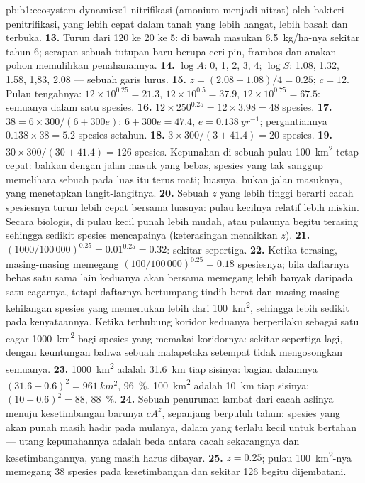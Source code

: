 \begin{solution}{pb:b1:ecosystem-dynamics:1}
nitrifikasi (amonium menjadi nitrat) oleh bakteri penitrifikasi, yang
lebih cepat dalam tanah yang lebih hangat, lebih basah dan terbuka.
\textbf{13.} Turun dari \num{120} ke \num{20} ke \num{5}: di bawah
masukan \qty{6.5}{kg/ha}-nya sekitar tahun 6; serapan sebuah tutupan
baru berupa ceri pin, frambos dan anakan pohon memulihkan
penahanannya.
\textbf{14.} $\log A$: 0, 1, 2, 3, 4; $\log S$: 1.08, 1.32, 1.58,
1,83, 2,08 --- sebuah garis lurus.
\textbf{15.} $z = (2.08 - 1.08)/4 = 0.25$; $c = 12$. Pulau tengahnya:
$12\times 10^{0.25} = 21.3$, $12\times 10^{0.5} = 37.9$, $12\times
10^{0.75} = 67.5$: semuanya dalam satu spesies.
\textbf{16.} $12\times 250^{0.25} = 12\times 3.98 = 48$ spesies.
\textbf{17.} $38 = 6\times 300/(6 + 300e)$: $6 + 300e = 47.4$, $e =
\qty{0.138}{yr^{-1}}$; pergantiannya $0.138\times 38 = 5.2$ spesies setahun.
\textbf{18.} $3\times 300/(3 + 41.4) = 20$ spesies.
\textbf{19.} $30\times 300/(30 + 41.4) = 126$ spesies. Kepunahan di
sebuah pulau \qty{100}{km^2} tetap cepat: bahkan dengan jalan masuk
yang bebas, spesies yang tak sanggup memelihara sebuah  pada
luas itu terus mati; luasnya, bukan jalan masuknya, yang menetapkan
langit-langitnya.
\textbf{20.} Sebuah $z$ yang lebih tinggi berarti cacah spesiesnya
turun lebih cepat bersama luasnya: pulau kecilnya relatif lebih
miskin. Secara biologis,  di pulau kecil punah lebih mudah,
atau pulaunya begitu terasing sehingga sedikit spesies mencapainya
(keterasingan menaikkan $z$).
\textbf{21.} $(1000/100\,000)^{0.25} = 0.01^{0.25} = 0.32$: sekitar
sepertiga.
\textbf{22.} Ketika terasing, masing-masing memegang $(100/100\,000)^{0.25} = 0.18$
spesiesnya; bila daftarnya bebas satu sama lain keduanya akan bersama
memegang lebih banyak daripada satu cagarnya, tetapi daftarnya
bertumpang tindih berat dan masing-masing kehilangan spesies yang
memerlukan lebih dari \qty{100}{km^2}, sehingga lebih sedikit pada
kenyataannya. Ketika terhubung koridor keduanya berperilaku sebagai
satu cagar \qty{1000}{km^2} bagi spesies yang memakai koridornya:
sekitar sepertiga lagi, dengan keuntungan bahwa sebuah malapetaka
setempat tidak mengosongkan semuanya.
\textbf{23.} \qty{1000}{km^2} adalah \qty{31.6}{km} tiap sisinya:
bagian dalamnya $(31.6 - 0.6)^2 = \qty{961}{km^2}$, \qty{96}{\%}.
\qty{100}{km^2} adalah \qty{10}{km} tiap sisinya: $(10 - 0.6)^2 = 88$,
\qty{88}{\%}.
\textbf{24.} Sebuah penurunan lambat dari cacah aslinya menuju
kesetimbangan barunya $cA^z$, sepanjang berpuluh tahun: spesies yang
akan punah masih hadir pada mulanya, dalam  yang terlalu kecil
untuk bertahan --- utang kepunahannya adalah beda antara cacah
sekarangnya dan kesetimbangannya, yang masih harus dibayar.
\textbf{25.} $z = 0.25$; pulau \qty{100}{km^2}-nya memegang \num{38}
spesies pada kesetimbangan dan sekitar \num{126} begitu dijembatani.
\end{solution}
